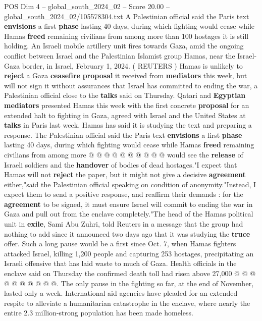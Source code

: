 \begin{textsample}{POS Dim 4 – global\_south\_2024\_02 – Score 20.00 – global\_south\_2024\_02/105578304.txt}  \label{ex:f4_pos_078}
A Palestinian official said the Paris text \textbf{envisions} a first \textbf{phase} lasting 40 days, during which fighting would cease while Hamas \textbf{freed} remaining civilians from among more than 100 hostages it is still holding.
An Israeli mobile artillery unit fires towards Gaza, amid the ongoing conflict between Israel and the Palestinian Islamist group Hamas, near the Israel-Gaza border, in Israel, February 1, 2024. ( REUTERS ) Hamas is unlikely to \textbf{reject} a Gaza \textbf{ceasefire} \textbf{proposal} it received from \textbf{mediators} this week, but will not sign it without assurances that Israel has committed to ending the war, a Palestinian official close to the \textbf{talks} said on Thursday.
Qatari and \textbf{Egyptian} \textbf{mediators} presented Hamas this week with the first concrete \textbf{proposal} for an extended halt to fighting in Gaza, agreed with Israel and the United States at \textbf{talks} in Paris last week.
Hamas has said it is studying the text and preparing a response.
The Palestinian official said the Paris text \textbf{envisions} a first \textbf{phase} lasting 40 days, during which fighting would cease while Hamas \textbf{freed} remaining civilians from among more @ @ @ @ @ @ @ @ @ @ would see the \textbf{release} of Israeli soldiers and the \textbf{handover} of bodies of dead hostages."I expect that Hamas will not \textbf{reject} the paper, but it might not give a decisive \textbf{agreement} either,"said the Palestinian official speaking on condition of anonymity."Instead, I expect them to send a positive response, and reaffirm their demands : for the \textbf{agreement} to be signed, it must ensure Israel will commit to ending the war in Gaza and pull out from the enclave completely."The head of the Hamas political unit in \textbf{exile}, Sami Abu Zuhri, told Reuters in a message that the group had nothing to add since it announced two days ago that it was studying the \textbf{truce} offer.
Such a long pause would be a first since Oct. 7, when Hamas fighters attacked Israel, killing 1,200 people and capturing 253 hostages, precipitating an Israeli offensive that has laid waste to much of Gaza.
Health officials in the enclave said on Thursday the confirmed death toll had risen above 27,000 @ @ @ @ @ @ @ @ @ @.
The only pause in the fighting so far, at the end of November, lasted only a week.
International aid agencies have pleaded for an extended respite to alleviate a humanitarian catastrophe in the enclave, where nearly the entire 2.3 million-strong population has been made homeless.

\end{textsample}

